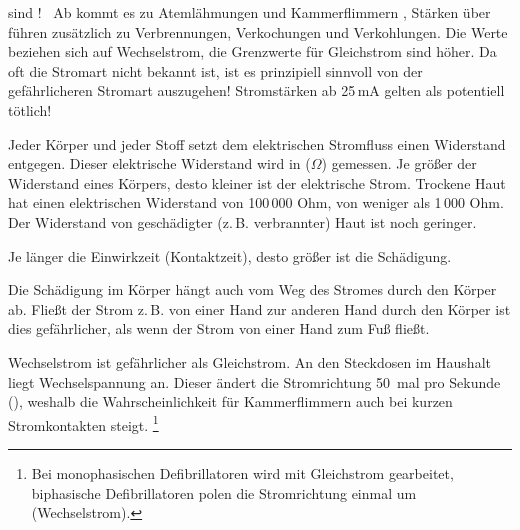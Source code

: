 {\begin{description}
{   sind !~\cite{BoehmerTaschRett6}
  Ab  kommt es zu Atemlähmungen und
  Kammerflimmern \cite{Jaros1}, Stärken über  führen zusätzlich zu
  Verbrennungen, Verkochungen und Verkohlungen. \cite{LPN3} Die Werte beziehen 
  sich auf Wechselstrom, die Grenzwerte für Gleichstrom sind höher. Da oft die 
  Stromart nicht bekannt ist, ist es prinzipiell sinnvoll von der
  gefährlicheren  Stromart auszugehen!} Stromstärken ab 25\,mA gelten als
  potentiell tötlich!
  \item {} Jeder Körper und
  jeder Stoff setzt dem elektrischen Stromfluss einen
  Widerstand entgegen. Dieser elektrische Widerstand wird in
   ($\Omega$) gemessen. Je größer der Widerstand eines
  Körpers, desto kleiner ist der elektrische Strom. Trockene
  Haut hat einen elektrischen Widerstand von 100\,000 Ohm,
   von
  weniger als 1\,000 Ohm. Der Widerstand von geschädigter
  (z.\,B. verbrannter) Haut ist noch geringer.
  \item[Einwirkdauer:] Je länger die Einwirkzeit (Kontaktzeit), desto
  größer ist die Schädigung.
  \item[Stromweg:] Die Schädigung im Körper hängt auch vom Weg des Stromes
  durch den Körper ab. Fließt der Strom z.\,B. von einer Hand zur anderen Hand
  durch den Körper ist dies gefährlicher, als wenn der Strom von einer Hand zum
  Fuß fließt.
  \item[Stromart:] Wechselstrom ist gefährlicher als Gleichstrom. An den
  Steckdosen im Haushalt liegt Wechselspannung an. Dieser ändert die
  Stromrichtung 50~mal pro Sekunde (), weshalb die
  Wahrscheinlichkeit für Kammerflimmern auch bei kurzen Stromkontakten steigt.
  \cite{RedelsteinerHRNS1} \footnote{Bei monophasischen Defibrillatoren wird mit
  Gleichstrom gearbeitet, biphasische Defibrillatoren polen die Stromrichtung
  einmal um (Wechselstrom).}
\end{description}



}{

}{}{}{}


